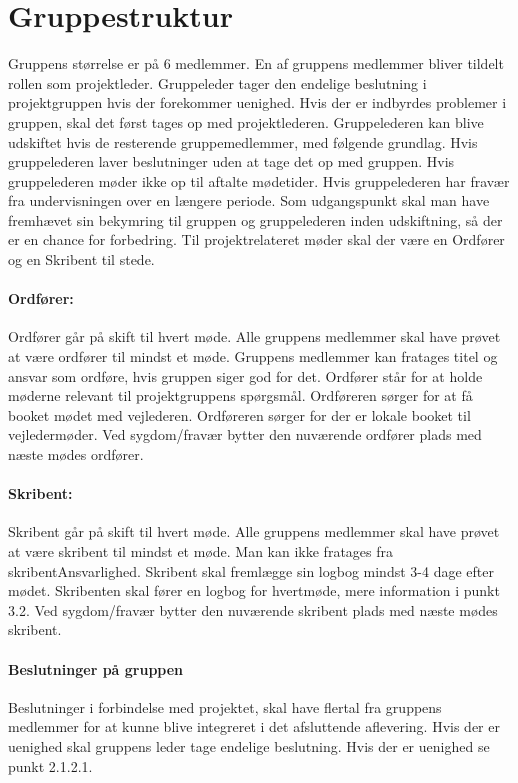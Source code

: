 \section{Gruppestruktur}
Gruppens størrelse er på 6 medlemmer.
En af gruppens medlemmer bliver tildelt rollen som projektleder.
Gruppeleder tager den endelige beslutning i projektgruppen hvis der forekommer uenighed.
Hvis der er indbyrdes problemer i gruppen, skal det først tages op med projektlederen.
Gruppelederen kan blive udskiftet hvis de resterende gruppemedlemmer, med følgende grundlag.
Hvis gruppelederen laver beslutninger uden at tage det op med gruppen.
Hvis gruppelederen møder ikke op til aftalte mødetider.
Hvis gruppelederen har fravær fra undervisningen over en længere periode.
Som udgangspunkt skal man have fremhævet sin bekymring til gruppen og gruppelederen inden udskiftning, så der er en chance for forbedring.
Til projektrelateret møder skal der være en Ordfører og en Skribent til  stede.

\paragraph{Ordfører: }
Ordfører går på skift til hvert møde. 
Alle gruppens medlemmer skal have prøvet at være ordfører til mindst et møde.
Gruppens medlemmer kan fratages titel og ansvar som ordføre, hvis gruppen siger god for det. 
Ordfører står for at holde møderne relevant til projektgruppens spørgsmål.
Ordføreren sørger for at få booket mødet med vejlederen.
Ordføreren sørger for der er lokale booket til vejledermøder.
Ved sygdom/fravær bytter den nuværende ordfører plads med næste mødes ordfører.


\paragraph{Skribent: }
Skribent går på skift til hvert møde.
Alle gruppens medlemmer skal have prøvet at være skribent til mindst et møde. 
Man kan ikke fratages fra skribentAnsvarlighed.
Skribent skal fremlægge sin logbog mindst 3-4 dage efter mødet.
Skribenten skal fører en logbog for hvertmøde, mere information i punkt 3.2.
Ved sygdom/fravær bytter den nuværende skribent plads med næste mødes skribent.

\paragraph{Beslutninger på gruppen}
Beslutninger i forbindelse med projektet, skal have flertal fra gruppens medlemmer for at kunne blive integreret i det afsluttende aflevering.
Hvis der er uenighed skal gruppens leder tage endelige beslutning.
Hvis der er uenighed se punkt 2.1.2.1.



